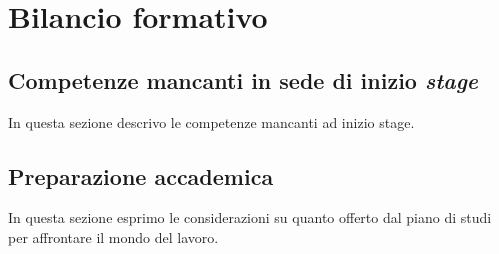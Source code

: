 \section{Bilancio formativo}

\subsection{Competenze mancanti in sede di inizio \emph{stage}}
In questa sezione descrivo le competenze mancanti ad inizio stage.

\subsection{Preparazione accademica}
In questa sezione esprimo le considerazioni su quanto offerto dal piano di studi per affrontare il mondo del lavoro.